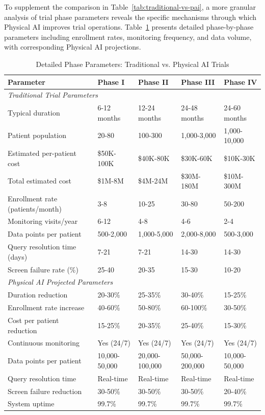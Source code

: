 To supplement the comparison in Table~\ref{tab:traditional-vs-pai}, a more
granular analysis of trial phase parameters reveals the specific mechanisms
through which Physical AI improves trial operations. Table~\ref{tab:phase-detailed}
presents detailed phase-by-phase parameters including enrollment rates,
monitoring frequency, and data volume, with corresponding Physical AI
projections.

\begin{table}[H]
\centering
\caption{Detailed Phase Parameters: Traditional vs. Physical AI Trials}
\label{tab:phase-detailed}
\small
\begin{tabularx}{\textwidth}{l X X X X}
\toprule
\textbf{Parameter} & \textbf{Phase I} & \textbf{Phase II} & \textbf{Phase III} & \textbf{Phase IV} \\
\midrule
\multicolumn{5}{l}{\textit{Traditional Trial Parameters}} \\
\midrule
Typical duration & 6-12 months & 12-24 months & 24-48 months & 24-60 months \\
Patient population & 20-80 & 100-300 & 1,000-3,000 & 1,000-10,000 \\
Estimated per-patient cost & \$50K-100K & \$40K-80K & \$30K-60K & \$10K-30K \\
Total estimated cost & \$1M-8M & \$4M-24M & \$30M-180M & \$10M-300M \\
Enrollment rate (patients/month) & 3-8 & 10-25 & 30-80 & 50-200 \\
Monitoring visits/year & 6-12 & 4-8 & 4-6 & 2-4 \\
Data points per patient & 500-2,000 & 1,000-5,000 & 2,000-8,000 & 500-3,000 \\
Query resolution time (days) & 7-21 & 7-21 & 14-30 & 14-30 \\
Screen failure rate (\%) & 25-40 & 20-35 & 15-30 & 10-20 \\
\midrule
\multicolumn{5}{l}{\textit{Physical AI Projected Parameters}} \\
\midrule
Duration reduction & 20-30\% & 25-35\% & 30-40\% & 15-25\% \\
Enrollment rate increase & 40-60\% & 50-80\% & 60-100\% & 30-50\% \\
Cost per patient reduction & 15-25\% & 20-35\% & 25-40\% & 15-30\% \\
Continuous monitoring & Yes (24/7) & Yes (24/7) & Yes (24/7) & Yes (24/7) \\
Data points per patient & 10,000-50,000 & 20,000-100,000 & 50,000-200,000 & 10,000-50,000 \\
Query resolution time & Real-time & Real-time & Real-time & Real-time \\
Screen failure reduction & 30-50\% & 30-50\% & 30-50\% & 20-40\% \\
System uptime & 99.7\% & 99.7\% & 99.7\% & 99.7\% \\
\bottomrule
\end{tabularx}
\end{table}

